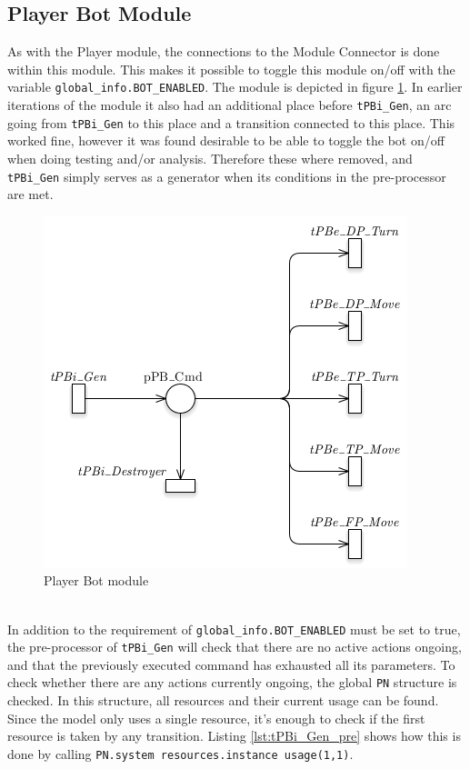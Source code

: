 \documentclass[runningheads,a4paper]{llncs}
\begin{document}
\subsection{Player Bot Module}
As with the Player module, the connections to the Module Connector is done within this module. This makes it possible to toggle this module on/off with the variable \verb!global_info.BOT_ENABLED!. The module is depicted in figure \ref{fig:player_bot_module}. In earlier iterations of the module it also had an additional place before \verb!tPBi_Gen!, an arc going from \verb!tPBi_Gen! to this place and a transition connected to this place. This worked fine, however it was found desirable to be able to toggle the bot on/off when doing testing and/or analysis. Therefore these where removed, and \verb!tPBi_Gen! simply serves as a generator when its conditions in the pre-processor are met.
\begin{figure}
	\begin{center}
		\includegraphics[scale=0.65]{images/playerBotModule}
		\caption{Player Bot module}
		\label{fig:player_bot_module}
	\end{center}
\end{figure}\\
In addition to the requirement of \verb!global_info.BOT_ENABLED! must be set to true, the pre-processor of \verb!tPBi_Gen! will check that there are no active actions ongoing, and that the previously executed command has exhausted all its parameters. To check whether there are any actions currently ongoing, the global \verb!PN! structure is checked. In this structure, all resources and their current usage can be found. Since the model only uses a single resource, it's enough to check if the first resource is taken by any transition. Listing \ref{lst:tPBi_Gen_pre} shows how this is done by calling \verb!PN.system resources.instance usage(1,1)!.
\end{document}
